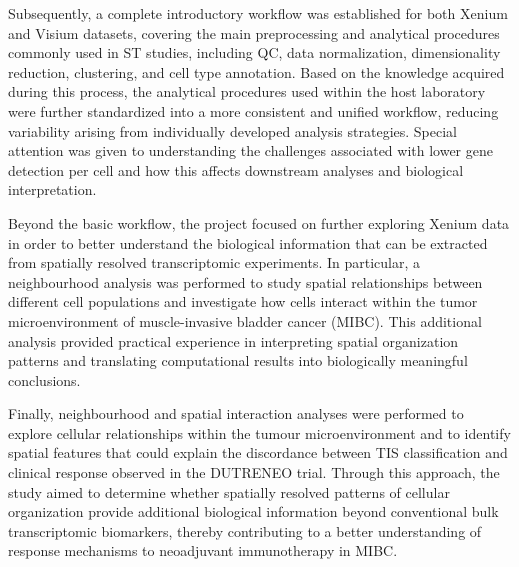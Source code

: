Subsequently, a complete introductory workflow was established for both Xenium and Visium datasets, covering the main preprocessing and analytical procedures commonly used in ST studies, including QC, data normalization, dimensionality reduction, clustering, and cell type annotation. Based on the knowledge acquired during this process, the analytical procedures used within the host laboratory were further standardized into a more consistent and unified workflow, reducing variability arising from individually developed analysis strategies. Special attention was given to understanding the challenges associated with lower gene detection per cell and how this affects downstream analyses and biological interpretation.

Beyond the basic workflow, the project focused on further exploring Xenium data in order to better understand the biological information that can be extracted from spatially resolved transcriptomic experiments. In particular, a neighbourhood analysis was performed to study spatial relationships between different cell populations and investigate how cells interact within the tumor microenvironment of muscle-invasive bladder cancer (MIBC). This additional analysis provided practical experience in interpreting spatial organization patterns and translating computational results into biologically meaningful conclusions. 

Finally, neighbourhood and spatial interaction analyses were performed to explore cellular relationships within the tumour microenvironment and to identify spatial features that could explain the discordance between TIS classification and clinical response observed in the DUTRENEO trial. Through this approach, the study aimed to determine whether spatially resolved patterns of  cellular organization provide additional biological information beyond conventional bulk transcriptomic biomarkers, thereby contributing to a better understanding of response mechanisms to neoadjuvant immunotherapy in MIBC.





